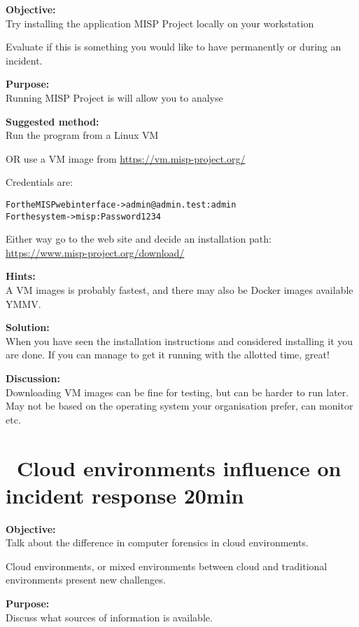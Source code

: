 \documentclass[a4paper,11pt,notitlepage]{report}
\begin{document}
{\bf Objective:}\\
Try installing the application MISP Project locally on your workstation

Evaluate if this is something you would like to have permanently or during an incident.

{\bf Purpose:}\\
Running MISP Project is  will allow you to analyse

{\bf Suggested method:}\\
Run the program from a Linux VM

OR use a VM image from \url{https://vm.misp-project.org/}

Credentials are:
\begin{alltt}\footnotesize
For the MISP web interface -> admin@admin.test:admin
For the system -> misp:Password1234
\end{alltt}

Either way go to the web site and decide an installation path:\\
\url{https://www.misp-project.org/download/}

{\bf Hints:}\\
A VM images is probably fastest, and there may also be Docker images available YMMV.

{\bf Solution:}\\
When you have seen the installation instructions and considered installing it you are done. If you can manage to get it running with the allotted time, great!

{\bf Discussion:}\\
Downloading VM images can be fine for testing, but can be harder to run later. May not be based on the operating system your organisation prefer, can monitor etc.



\chapter{\faInfoCircle\ Cloud environments influence on incident response 20min}
\label{ex:cloud-incident-response}

{\bf Objective:}\\
Talk about the difference in computer forensics in cloud environments.

Cloud environments, or mixed environments between cloud and traditional environments present new challenges.

{\bf Purpose:}\\
Discuss what sources of information is available.
\end{document}
